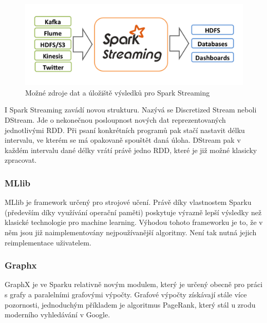 \documentclass[thesis=B,czech]{FITthesis}[2012/06/26]
\begin{document}
	\begin{figure}[ht]
    	\centering
    	\includegraphics[width=1\textwidth]{images/spark-streaming-arch.png}
    	\caption{Možné zdroje dat a úložiště výsledků pro Spark Streaming\cite{streaming-guide}}
    	\label{fig:spark_streaming_arch}
	\end{figure}
	
	I Spark Streaming zavádí novou strukturu. Nazývá se Discretized Stream neboli DStream. Jde o nekonečnou posloupnost nových dat reprezentovaných jednotlivými RDD. Při psaní konkrétních programů pak stačí nastavit délku intervalu, ve kterém se má opakovaně spouštět daná úloha. DStream pak v každém intervalu dané délky vrátí právě jedno RDD, které je již možné klasicky zpracovat. 
	

\subsubsection{MLlib}
	MLlib je framework určený pro strojové učení. Právě díky vlastnostem Sparku (především díky využívání operační paměti) poskytuje výrazně lepší výsledky než klasické technologie pro machine learning. Výhodou tohoto frameworku je to, že v něm jsou již naimplementovány nejpoužívanější algoritmy. Není tak nutná jejich reimplementace uživatelem. 

	
\subsubsection{Graphx}
	GraphX je ve Sparku relativně novým modulem, který je určený obecně pro práci s grafy a paralelními grafovými výpočty. Grafové výpočty získávají stále více pozornosti, jednoduchým příkladem je algoritmus PageRank, který stál u zrodu moderního vyhledávání v Google\cite{google-pagerank}. 
	


\end{document}
